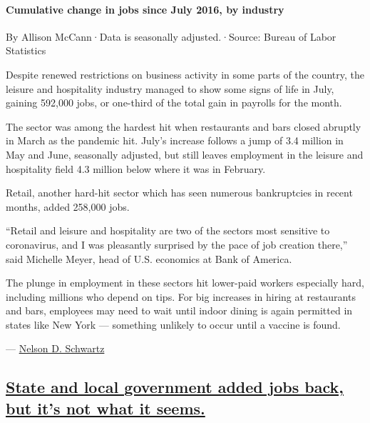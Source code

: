 \hypertarget{cumulative-change-in-jobs-since-july-2016-by-industry}{%
\paragraph{Cumulative change in jobs since July 2016, by
industry}\label{cumulative-change-in-jobs-since-july-2016-by-industry}}

By Allison McCann·Data is seasonally adjusted.·Source: Bureau of Labor
Statistics

Despite renewed restrictions on business activity in some parts of the
country, the leisure and hospitality industry managed to show some signs
of life in July, gaining 592,000 jobs, or one-third of the total gain in
payrolls for the month.

The sector was among the hardest hit when restaurants and bars closed
abruptly in March as the pandemic hit. July's increase follows a jump of
3.4 million in May and June, seasonally adjusted, but still leaves
employment in the leisure and hospitality field 4.3 million below where
it was in February.

Retail, another hard-hit sector which has seen numerous bankruptcies in
recent months, added 258,000 jobs.

``Retail and leisure and hospitality are two of the sectors most
sensitive to coronavirus, and I was pleasantly surprised by the pace of
job creation there,'' said Michelle Meyer, head of U.S. economics at
Bank of America.

The plunge in employment in these sectors hit lower-paid workers
especially hard, including millions who depend on tips. For big
increases in hiring at restaurants and bars, employees may need to wait
until indoor dining is again permitted in states like New York ---
something unlikely to occur until a vaccine is found.

--- \href{https://www.nytimes.com/by/nelson-d-schwartz}{Nelson D.
Schwartz}

\hypertarget{state-and-local-government-added-jobs-back-but-its-not-what-it-seems}{%
\subsection{\texorpdfstring{\protect\hyperlink{state-and-local-government-added-jobs-back-but-its-not-what-it-seems}{State
and local government added jobs back, but it's not what it
seems.}}{State and local government added jobs back, but it's not what it seems.}}\label{state-and-local-government-added-jobs-back-but-its-not-what-it-seems}}

